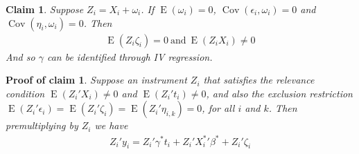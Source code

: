 \documentclass[10pt]{article}
\newtheorem{claim}{Claim}
\newtheorem{claimproof}{Proof of claim}[claim]
\begin{document}
\begin{claim}
Suppose $ Z_i=X_i+\omega_i$. If $\operatorname{E}(\omega_i)=0$, $\operatorname{Cov}(\epsilon_i,\omega_i)=0$ and $\operatorname{Cov}(\eta_i,\omega_i)=0$. Then
\begin{align}
\operatorname{E}(Z_i\zeta_i)=0 \ \text{and} \  \operatorname{E}(Z_iX_i)\neq0
\end{align}
And so $\gamma$ can be identified through IV regression.
\end{claim}
\begin{claimproof}

Suppose an instrument $Z_i$ that satisfies the relevance condition $\operatorname{E}(Z_i'X_i)\neq 0$ and $\operatorname{E}(Z_i't_i)\neq 0$, and also the exclusion restriction $\operatorname{E}(Z_i'\epsilon_i)=\operatorname{E}(Z_i'\zeta_i)=\operatorname{E}(Z_i'\eta_{i,k})=0$, for all $i$ and $k$. Then premultiplying by $Z_i$ we have
        \begin{align}
            Z_i'y_i =  Z_i'\gamma^* t_i +  Z_i'{X^{*}_i}' \beta^* +  Z_i'\zeta_i
        \end{align}
        

\end{claimproof}
\end{document}
